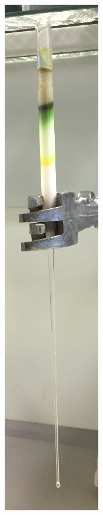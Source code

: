 \documentclass{article}
\begin{document}
      \begin{figure}
        \centering
        \begin{subfigure}{.5\textwidth}
          \centering
          \includegraphics[width=.4\linewidth]{Graphiken/Versuchsanordnungen/SauleTrennungCarotinbande.png}

\end{subfigure}
\end{figure}
\end{document}

